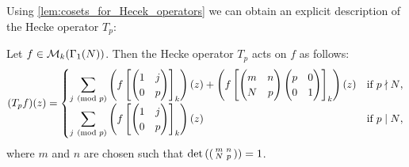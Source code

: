       Using \cref{lem:cosets_for_Hecek_operators} we can obtain an explicit description of the Hecke operator $T_{p}$:

      \begin{proposition}\label{prop:explicit_description_of_Hecke_operators_modular}
        Let $f \in \mathcal{M}_{k}(\Gamma_{1}(N))$. Then the Hecke operator $T_{p}$ acts on $f$ as follows:
        \[
          (T_{p}f)(z) = \begin{cases} \displaystyle{\sum_{j \ \left(\text{mod }p\right)}}\left(f\left[\begin{pmatrix} 1 & j \\ 0 & p \end{pmatrix}\right]_{k}\right)(z)+\left(f\left[\begin{pmatrix} m & n \\ N & p \end{pmatrix}\begin{pmatrix} p & 0 \\ 0 & 1 \end{pmatrix}\right]_{k}\right)(z) & \text{if $p \nmid N$}, \\ \displaystyle{\sum_{j \ \left(\text{mod }p\right)}}\left(f\left[\begin{pmatrix} 1 & j \\ 0 & p \end{pmatrix}\right]_{k}\right)(z) & \text{if $p \mid N$}, \end{cases}
        \]
        where $m$ and $n$ are chosen such that $\det\left(\begin{psmallmatrix} m & n \\ N & p \end{psmallmatrix}\right) = 1$.
      \end{proposition}
